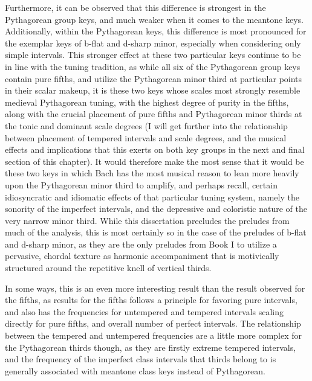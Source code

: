 Furthermore, it can be observed that this difference is strongest in the
Pythagorean group keys, and much weaker when it comes to the meantone
keys. Additionally, within the Pythagorean keys, this difference is most
pronounced for the exemplar keys of b-flat and d-sharp minor, especially
when considering only simple intervals. This stronger effect at these
two particular keys continue to be in line with the tuning tradition, as
while all six of the Pythagorean group keys contain pure fifths, and
utilize the Pythagorean minor third at particular points in their scalar
makeup, it is these two keys whose scales most strongly resemble
medieval Pythagorean tuning, with the highest degree of purity in the
fifths, along with the crucial placement of pure fifths and Pythagorean
minor thirds at the tonic and dominant scale degrees (I will get further
into the relationship between placement of tempered intervals and scale
degrees, and the musical effects and implications that this exerts on
both key groups in the next and final section of this chapter). It would
therefore make the most sense that it would be these two keys in which
Bach has the most musical reason to lean more heavily upon the
Pythagorean minor third to amplify, and perhaps recall, certain
idiosyncratic and idiomatic effects of that particular tuning system,
namely the sonority of the imperfect intervals, and the depressive and
coloristic nature of the very narrow minor third. While this
dissertation precludes the preludes from much of the analysis, this is
most certainly so in the case of the preludes of b-flat and d-sharp
minor, as they are the only preludes from Book I to utilize a pervasive,
chordal texture as harmonic accompaniment that is motivically structured
around the repetitive knell of vertical thirds.

In some ways, this is an even more interesting result than the result
observed for the fifths, as results for the fifths follows a principle
for favoring pure intervals, and also has the frequencies for untempered
and tempered intervals scaling directly for pure fifths, and overall
number of perfect intervals. The relationship between the tempered and
untempered frequencies are a little more complex for the Pythagorean
thirds though, as they are firstly extreme tempered intervals, and the
frequency of the imperfect class intervals that thirds belong to is
generally associated with meantone class keys instead of Pythagorean.

